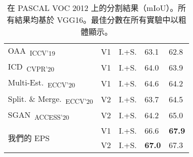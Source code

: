 \begin{table}[]
{\begin{tabular}{@{}lccll@{}}
\multicolumn{1}{l}{OAA~\cite{jiang2019integral}\textsubscript{ICCV'19}}                 & V1        & I.+S. & 63.1                    & 62.8                     \\
\multicolumn{1}{l}{ICD~\cite{fan2020learning}\textsubscript{CVPR'20}}                   & V1        & I.+S. & 64.0                    & 63.9                     \\
\multicolumn{1}{l}{Multi-Est.~\cite{fan2020employing}\textsubscript{ECCV'20}}           & V1        & I.+S. & 64.6                    & 64.2                     \\
\multicolumn{1}{l}{Split. \& Merge.~\cite{zhang2020splitting}\textsubscript{ECCV'20}}   & V2        & I.+S. & 63.7                    & 64.5                     \\
\multicolumn{1}{l}{SGAN~\cite{yao2020saliency}\textsubscript{ACCESS'20}}                & V2        & I.+S. & 64.2                    & 65.0                     \\ \midrule
\multicolumn{1}{l}{\multirow{2}{*}{我們的 EPS}}                                            & V1        & I.+S. & 66.6                    & \textbf{67.9}            \\
\multicolumn{1}{l}{}                                                                    & V2        & I.+S. & \textbf{67.0}           & 67.3                     \\ \bottomrule

\end{tabular}
}
\vspace{2mm}
\caption{在 PASCAL VOC 2012 上的分割結果（mIoU）。所有結果均基於 VGG16。最佳分數在所有實驗中以粗體顯示。}\vspace{-3mm}
\label{tab:seg_quan_voc_vgg16}
\end{table}
